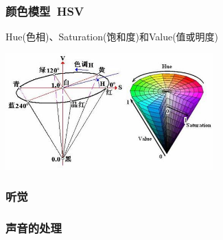 \documentclass{beamer}
\begin{document}
\begin{frame}
	\frametitle{颜色模型~{\small HSV}}
	Hue(色相)、Saturation(饱和度)和Value(值或明度)
	\begin{center}
		\includegraphics[width=8cm]{images/HSV_ColorModel.jpg}
	\end{center}
\end{frame}

\begin{frame}
	\frametitle{听觉}

\end{frame}

{
\frame[plain]{\transdissolve}
}

\begin{frame}
	\frametitle{声音的处理}

\end{frame}
\end{document}
